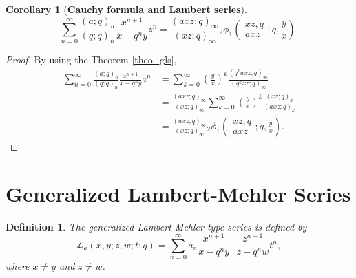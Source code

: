 \documentclass[12pt]{article}
\newtheorem{definition}{Definition}
\newtheorem{corollary}{Corollary}
\begin{document}
\begin{corollary}[\bf Cauchy formula and Lambert series]\label{cor_CGL}
    \begin{equation}
        \sum_{n=0}^{\infty}\frac{(a;q)_n}{(q;q)_n}\frac{x^{n+1}}{x-q^ny}z^n=\frac{(axz;q)_\infty}{(xz;q)_\infty}{}_{2}\phi_{1}\left(
    \begin{array}{c}
         xz,q \\
         axz
    \end{array}
    ;q,\frac{y}{x}
    \right).
    \end{equation}
\end{corollary}
\begin{proof}
By using the Theorem \ref{theo_gls},
\begin{align*}
    \sum_{n=0}^{\infty}\frac{(a;q)_n}{(q;q)_n}\frac{x^{n+1}}{x-q^ny}z^n&=\sum_{k=0}^{\infty}\left(\frac{y}{x}\right)^k\frac{(q^kaxz;q)_{\infty}}{(q^kxz;q)_\infty}\\
    &=\frac{(axz;q)_{\infty}}{(xz;q)_\infty}\sum_{k=0}^{\infty}\left(\frac{y}{x}\right)^k\frac{(xz;q)_{k}}{(axz;q)_k}\\
    &=\frac{(axz;q)_\infty}{(xz;q)_\infty}{}_{2}\phi_{1}\left(
    \begin{array}{c}
         xz,q \\
         axz
    \end{array}
    ;q,\frac{y}{x}
    \right).
\end{align*}
\end{proof}

\section{Generalized Lambert-Mehler Series}

\begin{definition}
The generalized Lambert-Mehler type series is defined by
\begin{equation}
    \mathcal{L}_{a}(x,y;z,w;t;q)=\sum_{n=0}^{\infty}a_{n}\frac{x^{n+1}}{x-q^ny}\cdot\frac{z^{n+1}}{z-q^nw}t^n,
\end{equation}
where $x\neq y$ and $z\neq w$.
\end{definition}
\end{document}
